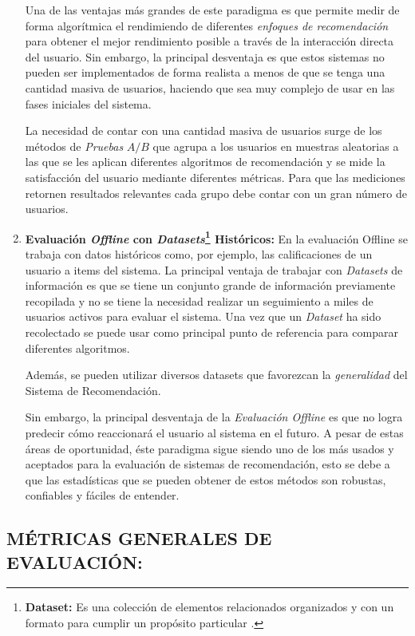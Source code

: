 \begin{enumerate}
    Una de las ventajas más grandes de este paradigma es que permite medir de forma algorítmica el rendimiendo de diferentes \textit{enfoques de recomendación} para obtener el mejor rendimiento posible a través de la interacción directa del usuario. Sin embargo, la principal desventaja es que estos sistemas no pueden ser implementados de forma realista a menos de que se tenga una cantidad masiva de usuarios, haciendo que sea muy complejo de usar en las fases iniciales del sistema.

    La necesidad de contar con una cantidad masiva de usuarios surge de los métodos de \textit{Pruebas} $A / B$ que agrupa a los usuarios en muestras aleatorias a las que se les aplican diferentes algoritmos de recomendación y se mide la satisfacción del usuario mediante diferentes métricas. Para que las mediciones retornen resultados relevantes cada grupo debe contar con un gran número de usuarios.

    \item \textbf{Evaluación \textit{Offline} con \textit{Datasets}\footnote{\textbf{Dataset: } Es una colección de elementos relacionados organizados y con un formato para cumplir un propósito particular \parencite{chapman-2019}.} Históricos: } En la evaluación Offline se trabaja con datos históricos como, por ejemplo, las calificaciones de un usuario a items del sistema. La principal ventaja de trabajar con \textit{Datasets} de información es que se tiene un conjunto grande de información previamente recopilada y no se tiene la necesidad realizar un seguimiento a miles de usuarios activos para evaluar el sistema. Una vez que un \textit{Dataset} ha sido recolectado se puede usar como principal punto de referencia para comparar diferentes algoritmos.
    
    Además, se pueden utilizar diversos datasets que favorezcan la \textit{generalidad} del Sistema de Recomendación.

    Sin embargo, la principal desventaja de la \textit{Evaluación Offline} es que no logra predecir cómo reaccionará el usuario al sistema en el futuro.
    A pesar de estas áreas de oportunidad, éste paradigma sigue siendo uno de los más usados y aceptados para la evaluación de sistemas de recomendación, esto se debe a que las estadísticas que se pueden obtener de estos métodos son robustas, confiables y fáciles de entender.

\end{enumerate}

\subsection{MÉTRICAS GENERALES DE EVALUACIÓN: }

